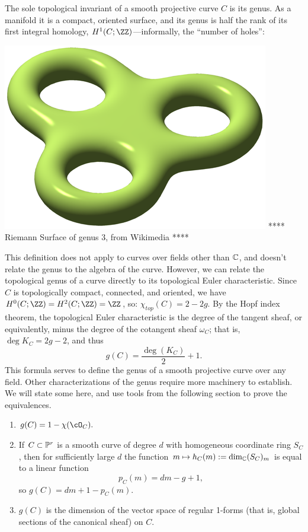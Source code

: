 The sole topological invariant of a smooth projective curve $C$ is its genus. As a manifold it is a compact, oriented surface, and its genus is half the rank of its first integral homology, $H^{1}(C; \ZZ)$---informally, the ``number of holes'':

\includegraphics[scale = 1]{RiemannSurface}
**** Riemann Surface of genus 3, from Wikimedia ****

This definition does not apply to curves over fields other than $\CC$, and doesn't relate the genus to the algebra of the curve. However, we can relate the topological genus of a curve directly to its topological Euler characteristic. Since $C$ is topologically compact, connected, and oriented, we have
$H^{0}(C; \ZZ)=H^{2}(C; \ZZ) = \ZZ$, so:
$
\chi_{top}(C) = 2-2g.
$
By the Hopf index theorem, the topological Euler characteristic is the degree of the tangent sheaf, or equivalently, minus the degree of the cotangent sheaf $\omega_{C}$; that is, $\deg K_{C} = 2g-2$, and thus
$$
g(C) = \frac{\deg(K_C)}{2} + 1.
$$
This formula serves to define the genus of a smooth projective curve over any field. 
Other characterizations of the genus require more machinery to establish. We will state some here, and use  tools from the following section to prove the equivalences.

\begin{enumerate}

\item\label{pa}
$
g(C) = 1 - \chi(\cO_C). 
$

\item\label{genus Hilbert} If $C \subset \PP^r$ is a smooth curve of degree $d$  with homogeneous coordinate ring
$S_C$, then for sufficiently large $d$ the function $m \mapsto h_C(m) := \dim_\CC (S_C)_m$ is equal to a linear function
$$
p_C(m) =  dm - g + 1,
$$
so $g(C) = dm+1-p_C(m)$. 

\item\label{genus 1forms} $g(C)$ is the dimension of the vector space of regular 1-forms (that is, global sections of the
canonical sheaf) on $C$.
\end{enumerate}

